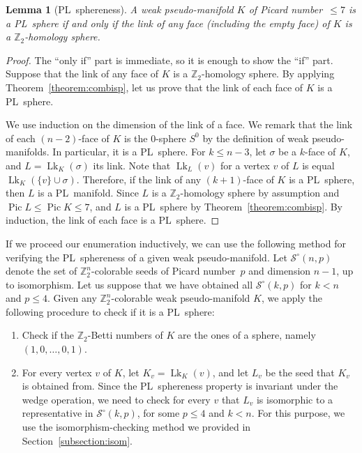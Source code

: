 \documentclass[11pt]{amsart}
\theoremstyle{plain}
\newtheorem{lemma}[theorem]{Lemma}
\numberwithin{equation}{section}
\theoremstyle{definition}
\newcommand{\cS}{\mathcal{S}}
\newcommand{\Z}{\mathbb{Z}}
\DeclareMathOperator{\Pic}{Pic}
\DeclareMathOperator{\Lk}{Lk}
\begin{document}
\begin{lemma}[PL~sphereness]
	\label{lemma:PL_sphereness}
	A weak pseudo-manifold $K$ of Picard number~$\leq 7$  is a PL~sphere if and only if the link of any face (including the empty face) of $K$ is a $\Z_2$-homology sphere.
\end{lemma}
\begin{proof}
	The ``only if'' part is immediate, so it is enough to show the ``if'' part.
	Suppose that the link of any face of $K$ is a $\Z_2$-homology sphere.
	By applying Theorem~\ref{theorem:combisp}, let us prove that the link of each face of $K$ is a PL~sphere.
	
	We use induction on the dimension of the link of a face.
	We remark that the link of each $(n-2)$-face of $K$ is the $0$-sphere $S^0$ by the definition of weak pseudo-manifolds.
	In particular, it is a PL~sphere.
	For $k \leq n-3$, let $\sigma$ be a $k$-face of $K$, and $L = \Lk_K(\sigma)$ its link.
	Note that $\Lk_L(v)$ for a vertex $v$ of $L$ is equal $\Lk_K( \{v\} \cup \sigma )$.
	Therefore, if the link of any $(k+1)$-face of $K$ is a PL~sphere, then $L$ is a PL~manifold.
	Since $L$ is a $\Z_2$-homology sphere by assumption and $\Pic L \leq \Pic K \leq 7$, and $L$ is a PL~sphere by Theorem~\ref{theorem:combisp}.
	By induction, the link of each face is a PL~sphere.
\end{proof}

If we proceed our enumeration inductively, we can use the following method for verifying the PL~sphereness of a given weak pseudo-manifold.
Let $\cS^\circ(n,p)$ denote the set of $\Z_2^n$-colorable seeds of Picard number~$p$ and dimension $n-1$, up to isomorphism.
Let us suppose that we have obtained all $\cS^\circ(k,p)$ for $k<n$ and $p\leq 4$.
Given any $\Z_2^n$-colorable weak pseudo-manifold $K$, we apply the following procedure to check if it is a PL~sphere:
\begin{enumerate}
	\item Check if the $\Z_2$-Betti numbers of $K$ are the ones of a sphere, namely $(1,0,\ldots,0,1)$.
	\item For every vertex $v$ of $K$, let $K_v = \Lk_K(v)$, and let $L_v$ be the seed that $K_v$ is obtained from.
	Since the PL~sphereness property is invariant under the wedge operation, we need to check for every $v$ that $L_v$ is isomorphic to a representative in $\cS^\circ(k,p)$, for some $p\leq 4$ and $k<n$.
	For this purpose, we use the isomorphism-checking method we provided in Section~\ref{subsection:isom}.
\end{enumerate}
\end{document}
